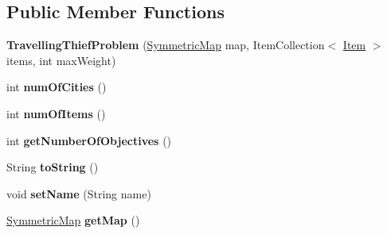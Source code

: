 \subsection*{Public Member Functions}
\begin{DoxyCompactItemize}
\item 
\hypertarget{classcom_1_1msu_1_1thief_1_1problems_1_1TravellingThiefProblem_a9242932977760ed10b2ea32a6c85c416}{{\bfseries Travelling\-Thief\-Problem} (\hyperlink{classcom_1_1msu_1_1thief_1_1model_1_1SymmetricMap}{Symmetric\-Map} map, Item\-Collection$<$ \hyperlink{classcom_1_1msu_1_1thief_1_1model_1_1Item}{Item} $>$ items, int max\-Weight)}\label{classcom_1_1msu_1_1thief_1_1problems_1_1TravellingThiefProblem_a9242932977760ed10b2ea32a6c85c416}

\item 
\hypertarget{classcom_1_1msu_1_1thief_1_1problems_1_1TravellingThiefProblem_a77375502664d11a35b61fdb837cc0070}{int {\bfseries num\-Of\-Cities} ()}\label{classcom_1_1msu_1_1thief_1_1problems_1_1TravellingThiefProblem_a77375502664d11a35b61fdb837cc0070}

\item 
\hypertarget{classcom_1_1msu_1_1thief_1_1problems_1_1TravellingThiefProblem_aa5bb95de358dbc9ca3bb1286984002dd}{int {\bfseries num\-Of\-Items} ()}\label{classcom_1_1msu_1_1thief_1_1problems_1_1TravellingThiefProblem_aa5bb95de358dbc9ca3bb1286984002dd}

\item 
\hypertarget{classcom_1_1msu_1_1thief_1_1problems_1_1TravellingThiefProblem_acc8c93330182f1b15b2dac8e355bcae6}{int {\bfseries get\-Number\-Of\-Objectives} ()}\label{classcom_1_1msu_1_1thief_1_1problems_1_1TravellingThiefProblem_acc8c93330182f1b15b2dac8e355bcae6}

\item 
\hypertarget{classcom_1_1msu_1_1thief_1_1problems_1_1TravellingThiefProblem_a2dac28a7f53eb6629a2e885d15165bf4}{String {\bfseries to\-String} ()}\label{classcom_1_1msu_1_1thief_1_1problems_1_1TravellingThiefProblem_a2dac28a7f53eb6629a2e885d15165bf4}

\item 
\hypertarget{classcom_1_1msu_1_1thief_1_1problems_1_1TravellingThiefProblem_abeb4a59b078a87d854767f3c5ab6f16a}{void {\bfseries set\-Name} (String name)}\label{classcom_1_1msu_1_1thief_1_1problems_1_1TravellingThiefProblem_abeb4a59b078a87d854767f3c5ab6f16a}

\item 
\hypertarget{classcom_1_1msu_1_1thief_1_1problems_1_1TravellingThiefProblem_aae7bc4d0f3eca1b0567fc8d37fe602db}{\hyperlink{classcom_1_1msu_1_1thief_1_1model_1_1SymmetricMap}{Symmetric\-Map} {\bfseries get\-Map} ()}\label{classcom_1_1msu_1_1thief_1_1problems_1_1TravellingThiefProblem_aae7bc4d0f3eca1b0567fc8d37fe602db}


\end{DoxyCompactItemize}
